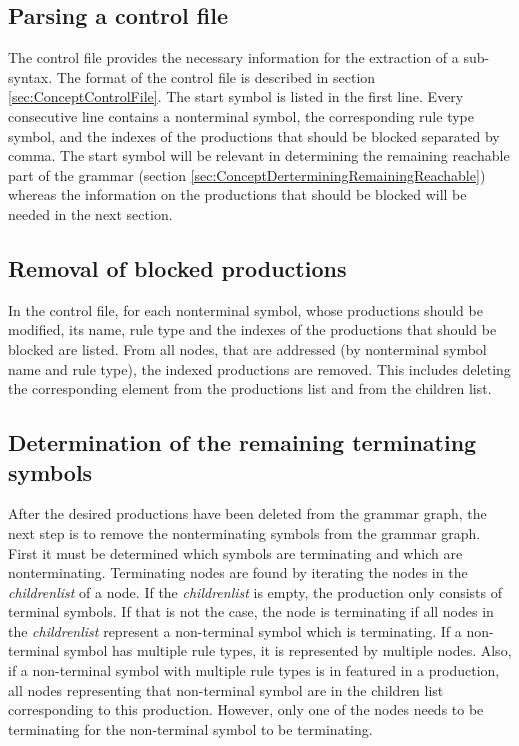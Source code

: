 \subsection{Parsing a control file}\label{sec:ConceptParsingControlFile}

The control file provides the necessary information for the extraction of a sub-syntax.
The format of the control file is described in section \ref{sec:ConceptControlFile}. 
The start symbol is listed in the first line.
Every consecutive line contains a nonterminal symbol, the corresponding rule type symbol, and the indexes of the productions that should be blocked separated by comma.
The start symbol will be relevant in determining the remaining reachable part of the grammar (section \ref{sec:ConceptDerterminingRemainingReachable}) whereas the information on the productions that should be blocked will be needed in the next section.

\subsection{Removal of blocked productions}\label{sec:ConceptRemovingBlockedProductions}

In the control file, for each nonterminal symbol, whose productions should be modified, its name, rule type and the indexes of the productions that should be blocked are listed.
From all nodes, that are addressed (by nonterminal symbol name and rule type), the indexed productions are removed.
This includes deleting the corresponding element from the productions list and from the children list.

\subsection{Determination of the remaining terminating symbols}\label{sec:ConceptDerterminingRemainingTerminating}

After the desired productions have been deleted from the grammar graph, the next step is to remove the nonterminating symbols from the grammar graph.
First it must be determined which symbols are terminating and which are nonterminating.
Terminating nodes are found by iterating the nodes in the \textit{children\textunderscore list} of a node.
If the \textit{children\textunderscore list} is empty, the production only consists of terminal symbols.
If that is not the case, the node is terminating if all nodes in the \textit{children\textunderscore list} represent a non-terminal symbol which is terminating.
If a non-terminal symbol has multiple rule types, it is represented by multiple nodes. Also, if a non-terminal symbol with multiple rule types is in featured in a production, all nodes representing that non-terminal symbol are in the children list corresponding to this production. However, only one of the nodes needs to be terminating for the non-terminal symbol to be terminating.

